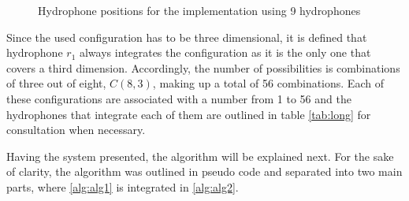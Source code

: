 \begin{figure}[!htbp]
	
	\captionsetup{justification=centering,margin=2cm}
	\caption{Hydrophone positions for the implementation using 9 hydrophones}
	\label{fig:9h-config}
\end{figure}

Since the used configuration has to be three dimensional, it is defined that hydrophone $r_1$ always integrates the configuration as it is the only one that covers a third dimension. Accordingly, the number of possibilities is combinations of three out of eight, $C(8,3)$, making up a total of 56 combinations. Each of these configurations are associated with a number from 1 to 56 and the hydrophones that integrate each of them are outlined in table \ref{tab:long} for consultation when necessary.

Having the system presented, the algorithm will be explained next. For the sake of clarity, the algorithm was outlined in pseudo code and separated into two main parts, where \ref{alg:alg1} is integrated in \ref{alg:alg2}.

